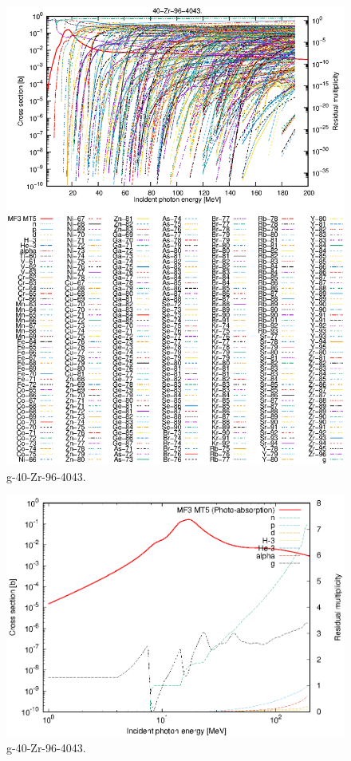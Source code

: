 \begin{figure}
 \includegraphics[width=\linewidth]{eps/g_40-Zr-96_4043.eps}
  \caption{g-40-Zr-96-4043.}
\end{figure}
\newpage \clearpage

\begin{figure}
 \includegraphics[width=\linewidth]{eps-log/g_40-Zr-96_4043.eps}
 \caption{g-40-Zr-96-4043.}
\end{figure}
\newpage \clearpage

